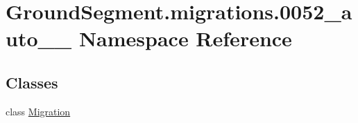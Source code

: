 \hypertarget{namespace_ground_segment_1_1migrations_1_10052__auto__20170324__2213}{}\section{Ground\+Segment.\+migrations.0052\+\_\+auto\+\_\+\_ Namespace Reference}
\label{namespace_ground_segment_1_1migrations_1_10052__auto__20170324__2213}
\subsection*{Classes}
\begin{DoxyCompactItemize}
\item 
class \hyperlink{class_ground_segment_1_1migrations_1_10052__auto__20170324__2213_1_1_migration}{Migration}
\end{DoxyCompactItemize}
